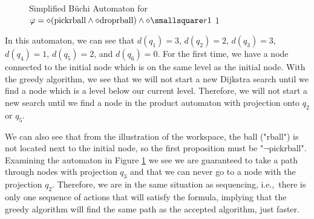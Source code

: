 \begin{figure}
\centering
{}
\caption{Simplified B\"uchi Automaton for $\varphi = \diamond (\text{pickrball} \wedge \diamond \text{droprball}) \wedge \diamond \smallsquare r1$ 1}
\label{fig:ex1SimplifiedBuchi}
\end{figure} 

In this automaton, we can see that $d(q_1)=3$, $d(q_2)=2$, $d(q_3)=3$, $d(q_4)=1$, $d(q_5)=2$, and $d(q_6)=0$. For the first time, we have a node connected to the initial node which is on the same level as the initial node. With the greedy algorithm, we see that we will not start a new Dijkstra search until we find a node which is a level below our current level. Therefore, we will not start a new search until we find a node in the product automaton with projection onto $q_2$ or $q_5$. 

We can also see that from the illustration of the workspace, the ball ("rball") is not located next to the initial node, so the first proposition must be "$\neg$pickrball". Examining the automaton in Figure \ref{fig:ex1SimplifiedBuchi} we see we are guaranteed to take a path through nodes with projection $q_3$ and that we can never go to a node with the projection $q_2$. Therefore, we are in the same situation as sequencing, i.e.,\ there is only one sequence of actions that will satisfy the formula, implying that the greedy algorithm will find the same path as the accepted algorithm, just faster. 

